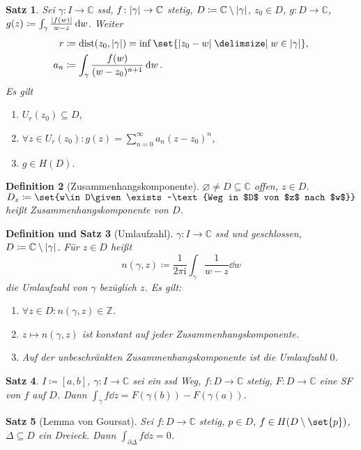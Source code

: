 \documentclass[a4paper]{article}
\newcounter{Sec}
\theoremstyle{marginbreak}
\newtheorem{definition}{Definition}[Sec]
\newtheorem{satz}[definition]{Satz}
\newtheorem{defsatz}[definition]{Definition und Satz}
\newcommand{\C}{\mathbb{C}}
\renewcommand{\i}{\mathrm{i}}
\DeclareMathOperator{\dist}{dist}
\begin{document}
	\begin{satz}
		Sei $\gamma\colon I\to\C$ ssd, $f\colon\abs{\gamma}\to\C$ stetig, $D\coloneqq \C\setminus\abs{\gamma}$,
		$z_0\in D$, $g\colon D\to\C$, $g(z)\coloneqq\int_\gamma\frac{\abs{f(w)}}{w-z}\dd{w}$. Weiter
		\begin{align*}
			r &\coloneqq \dist(z_0,\abs{\gamma}) = \inf\set{\abs{z_0-w}\given w\in\abs{\gamma}},\\
			a_n &\coloneqq \int_\gamma\frac{f(w)}{(w-z_0)^{n+1}}\dd{w}.
		\end{align*}
		Es gilt
		\begin{enumerate}[label=(\alph*)]
			\item $U_r(z_0)\subseteq D$,
			\item $\forall z\in U_r(z_0): g(z)=\sum_{n=0}^\infty a_n(z-z_0)^n$,
			\item $g\in H(D)$.
		\end{enumerate}
	\end{satz}
	\begin{definition}[Zusammenhangskomponente]
		$\varnothing\neq D\subseteq\C$ offen, $z\in D$. $D_z\coloneqq\set{w\in D\given
			\exists~\text{Weg in $D$ von $z$ nach $w$}}$ heißt Zusammenhangskomponente von $D$.
	\end{definition}
	\begin{defsatz}[Umlaufzahl]
		$\gamma\colon I\to\C$ ssd und geschlossen, $D\coloneqq\C\setminus\abs{\gamma}$.
		Für $z\in D$ heißt
		\[
			n(\gamma, z)\coloneqq\frac{1}{2\pi\i}\int_\gamma\frac{1}{w-z}\dd{w}
		\]
		die Umlaufzahl von $\gamma$ bezüglich $z$. Es gilt:
		\begin{enumerate}[label=(\alph*)]
			\item $\forall z\in D: n(\gamma, z)\in\mathbb{Z}$.
			\item $z\mapsto n(\gamma, z)$ ist konstant auf jeder Zusammenhangskomponente.
			\item Auf der unbeschränkten Zusammenhangskomponente ist die Umlaufzahl $0$.
		\end{enumerate}
	\end{defsatz}
	\begin{satz}
		$I\coloneqq [a, b]$, $\gamma\colon I\to\C$ sei ein ssd Weg, $f\colon D\to\C$ stetig,
		$F\colon D\to\C$ eine SF von $f$ auf $D$. Dann $\int_\gamma f\dd{z}=F(\gamma(b))-F(\gamma(a))$.
	\end{satz}
	\begin{satz}[Lemma von Goursat]
		Sei $f\colon D\to\C$ stetig, $p\in D$, $f\in H(D\setminus\set{p})$, $\Delta\subseteq D$ ein Dreieck.
		Dann $\int_{\partial\Delta}f\dd{z}=0$.
	\end{satz}
\end{document}
